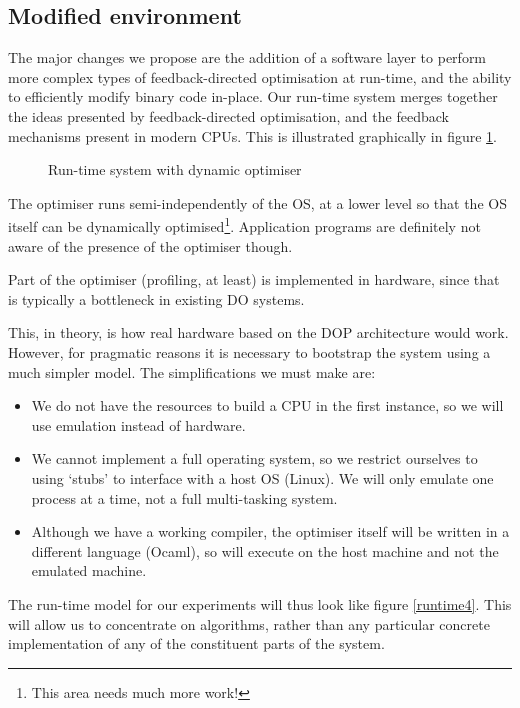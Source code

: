 \subsection{Modified environment}

The major changes we propose are the addition of a software layer to perform more complex types of feedback-directed optimisation at run-time, and the ability to efficiently modify binary code in-place. Our run-time system merges together the ideas presented by feedback-directed optimisation, and the feedback mechanisms present in modern CPUs. This is illustrated graphically in figure \ref{runtime3}.

\begin{figure}[tmb]
\centerline{}
\caption{\label{runtime3}Run-time system with dynamic optimiser}
\end{figure}

The optimiser runs semi-independently of the OS, at a lower level so that the OS itself can be dynamically optimised\footnote{This area needs much more work!}. Application programs are definitely not aware of the presence of the optimiser though.

Part of the optimiser (profiling, at least) is implemented in hardware, since that is typically a bottleneck in existing DO systems.

This, in theory, is how real hardware based on the DOP architecture would work. However, for pragmatic reasons it is necessary to bootstrap the system using a much simpler model. The simplifications we must make are:

\begin{itemize}
\item We do not have the resources to build a CPU in the first instance, so we will use emulation instead of hardware.
\item We cannot implement a full operating system, so we restrict ourselves to using `stubs' to interface with a host OS (Linux). We will only emulate one process at a time, not a full multi-tasking system.
\item Although we have a working compiler, the optimiser itself will be written in a different language (Ocaml), so will execute on the host machine and not the emulated machine.
\end{itemize}

The run-time model for our experiments will thus look like figure \ref{runtime4}. This will allow us to concentrate on algorithms, rather than any particular concrete implementation of any of the constituent parts of the system.

